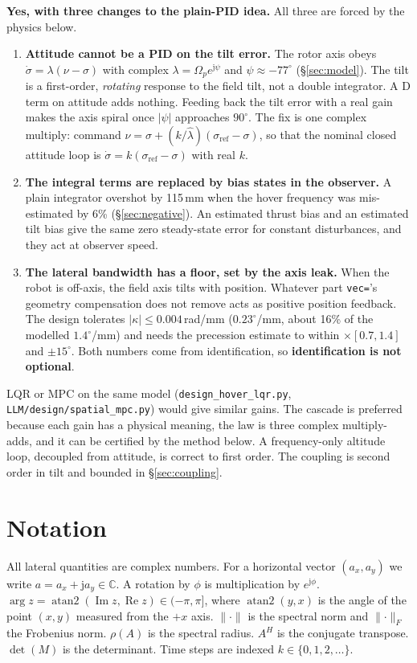 \documentclass[11pt]{article}
\newcommand{\C}{\mathbb{C}}
\newcommand{\jj}{\mathrm{j}}
\renewcommand{\Re}{\operatorname{Re}}
\renewcommand{\Im}{\operatorname{Im}}
\newcommand{\norm}[1]{\lVert #1 \rVert}
\begin{document}
\textbf{Yes, with three changes to the plain-PID idea.} All three are forced by the physics below.
\begin{enumerate}[leftmargin=*]
\item \textbf{Attitude cannot be a PID on the tilt error.} The rotor axis obeys
  $\dot\sigma=\lambda(\nu-\sigma)$ with complex $\lambda=\Omega_p e^{\jj\psi}$ and $\psi\approx-77^\circ$
  (\S\ref{sec:model}). The tilt is a first-order, \emph{rotating} response to the field tilt, not a
  double integrator. A D term on attitude adds nothing. Feeding back the tilt error with a real gain
  makes the axis spiral once $|\psi|$ approaches $90^\circ$. The fix is one complex multiply: command
  $\nu=\sigma+(k/\hat\lambda)(\sigma_{\mathrm{ref}}-\sigma)$, so that the nominal closed attitude loop
  is $\dot\sigma=k(\sigma_{\mathrm{ref}}-\sigma)$ with real $k$.
\item \textbf{The integral terms are replaced by bias states in the observer.} A plain integrator
  overshot by 115\,mm when the hover frequency was mis-estimated by 6\% (\S\ref{sec:negative}). An
  estimated thrust bias and an estimated tilt bias give the same zero steady-state error for constant
  disturbances, and they act at observer speed.
\item \textbf{The lateral bandwidth has a floor, set by the axis leak.} When the robot is off-axis,
  the field axis tilts with position. Whatever part \texttt{vec=}'s geometry compensation does not
  remove acts as positive position feedback. The design tolerates
  $|\kappa|\le 0.004$\,rad/mm ($0.23^\circ$/mm, about 16\% of the modelled $1.4^\circ$/mm) and
  needs the precession estimate to within $\times[0.7,1.4]$ and $\pm15^\circ$. Both numbers come from
  identification, so \textbf{identification is not optional}.
\end{enumerate}
LQR or MPC on the same model (\texttt{design\_hover\_lqr.py}, \texttt{LLM/design/spatial\_mpc.py})
would give similar gains. The cascade is preferred because each gain has a physical meaning, the
law is three complex multiply-adds, and it can be certified by the method below. A frequency-only
altitude loop, decoupled from attitude, is correct to first order. The coupling is second order in
tilt and bounded in \S\ref{sec:coupling}.

\section{Notation}
\label{sec:notation}
All lateral quantities are complex numbers. For a horizontal vector $(a_x,a_y)$ we write
$a=a_x+\jj a_y\in\C$. A rotation by $\phi$ is multiplication by $e^{\jj\phi}$.
$\arg z=\operatorname{atan2}(\Im z,\Re z)\in(-\pi,\pi]$, where $\operatorname{atan2}(y,x)$ is the
angle of the point $(x,y)$ measured from the $+x$ axis. $\norm{\cdot}$ is the spectral norm and
$\norm{\cdot}_F$ the Frobenius norm. $\rho(A)$ is the spectral radius. $A^H$ is the conjugate
transpose. $\det(M)$ is the determinant. Time steps are indexed $k\in\{0,1,2,\dots\}$.
\end{document}
